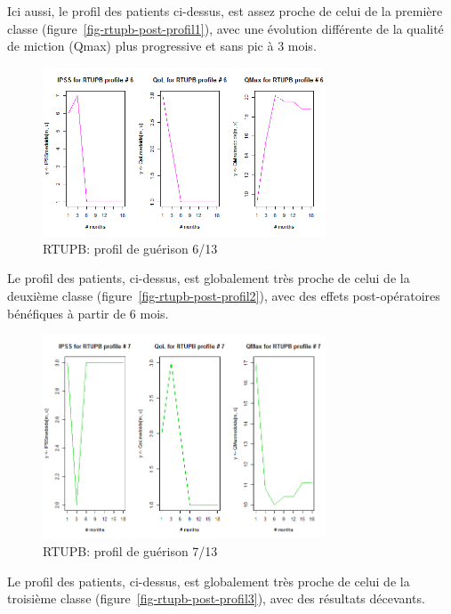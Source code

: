 Ici aussi, le profil des patients ci-dessus, est assez proche de celui de la première classe (figure~\ref{fig-rtupb-post-profil1}), avec une évolution différente de la qualité de miction (Qmax) plus progressive et sans pic à 3 mois.

\begin{figure}[H]
\centering
\includegraphics[width=0.75\textwidth]{../Fig/RTUPB/rtupb-profil-post-06.png}
\caption{RTUPB: profil de guérison 6/13}
\label{fig-rtupb-post-profil6}
\end{figure}

Le profil des patients, ci-dessus, est globalement très proche de celui de la deuxième classe (figure~\ref{fig-rtupb-post-profil2}), avec des effets post-opératoires bénéfiques à partir de 6 mois.

\begin{figure}[H]
\centering
\includegraphics[width=0.75\textwidth]{../Fig/RTUPB/rtupb-profil-post-07.png}
\caption{RTUPB: profil de guérison 7/13}
\label{fig-rtupb-post-profil7}
\end{figure}

Le profil des patients, ci-dessus, est globalement très proche de celui de la troisième classe (figure~\ref{fig-rtupb-post-profil3}), avec des résultats décevants.

